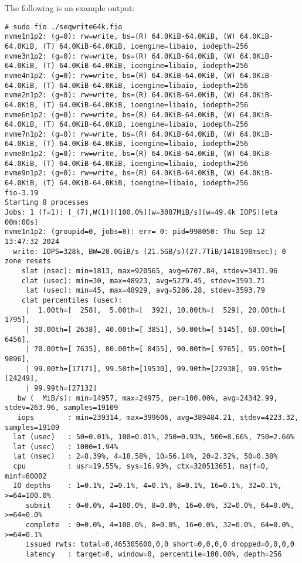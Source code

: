 The following is an example output:

\begin{verbatim}
# sudo fio ./seqwrite64k.fio
nvme1n1p2: (g=0): rw=write, bs=(R) 64.0KiB-64.0KiB, (W) 64.0KiB-64.0KiB, (T) 64.0KiB-64.0KiB, ioengine=libaio, iodepth=256
nvme3n1p2: (g=0): rw=write, bs=(R) 64.0KiB-64.0KiB, (W) 64.0KiB-64.0KiB, (T) 64.0KiB-64.0KiB, ioengine=libaio, iodepth=256
nvme4n1p2: (g=0): rw=write, bs=(R) 64.0KiB-64.0KiB, (W) 64.0KiB-64.0KiB, (T) 64.0KiB-64.0KiB, ioengine=libaio, iodepth=256
nvme2n1p2: (g=0): rw=write, bs=(R) 64.0KiB-64.0KiB, (W) 64.0KiB-64.0KiB, (T) 64.0KiB-64.0KiB, ioengine=libaio, iodepth=256
nvme6n1p2: (g=0): rw=write, bs=(R) 64.0KiB-64.0KiB, (W) 64.0KiB-64.0KiB, (T) 64.0KiB-64.0KiB, ioengine=libaio, iodepth=256
nvme7n1p2: (g=0): rw=write, bs=(R) 64.0KiB-64.0KiB, (W) 64.0KiB-64.0KiB, (T) 64.0KiB-64.0KiB, ioengine=libaio, iodepth=256
nvme8n1p2: (g=0): rw=write, bs=(R) 64.0KiB-64.0KiB, (W) 64.0KiB-64.0KiB, (T) 64.0KiB-64.0KiB, ioengine=libaio, iodepth=256
nvme9n1p2: (g=0): rw=write, bs=(R) 64.0KiB-64.0KiB, (W) 64.0KiB-64.0KiB, (T) 64.0KiB-64.0KiB, ioengine=libaio, iodepth=256
fio-3.19
Starting 8 processes
Jobs: 1 (f=1): [_(7),W(1)][100.0%][w=3087MiB/s][w=49.4k IOPS][eta 00m:00s]
nvme1n1p2: (groupid=0, jobs=8): err= 0: pid=998050: Thu Sep 12 13:47:32 2024
  write: IOPS=328k, BW=20.0GiB/s (21.5GB/s)(27.7TiB/1418198msec); 0 zone resets
    slat (nsec): min=1813, max=920565, avg=6707.84, stdev=3431.96
    clat (usec): min=30, max=48923, avg=5279.45, stdev=3593.71
     lat (usec): min=45, max=48929, avg=5286.28, stdev=3593.79
    clat percentiles (usec):
     |  1.00th=[  258],  5.00th=[  392], 10.00th=[  529], 20.00th=[ 1795],
     | 30.00th=[ 2638], 40.00th=[ 3851], 50.00th=[ 5145], 60.00th=[ 6456],
     | 70.00th=[ 7635], 80.00th=[ 8455], 90.00th=[ 9765], 95.00th=[ 9896],
     | 99.00th=[17171], 99.50th=[19530], 99.90th=[22938], 99.95th=[24249],
     | 99.99th=[27132]
   bw (  MiB/s): min=14957, max=24975, per=100.00%, avg=24342.99, stdev=263.96, samples=19109
   iops        : min=239314, max=399606, avg=389484.21, stdev=4223.32, samples=19109
  lat (usec)   : 50=0.01%, 100=0.01%, 250=0.93%, 500=8.66%, 750=2.66%
  lat (usec)   : 1000=1.94%
  lat (msec)   : 2=8.39%, 4=18.58%, 10=56.14%, 20=2.32%, 50=0.38%
  cpu          : usr=19.55%, sys=16.93%, ctx=320513651, majf=0, minf=60002
  IO depths    : 1=0.1%, 2=0.1%, 4=0.1%, 8=0.1%, 16=0.1%, 32=0.1%, >=64=100.0%
     submit    : 0=0.0%, 4=100.0%, 8=0.0%, 16=0.0%, 32=0.0%, 64=0.0%, >=64=0.0%
     complete  : 0=0.0%, 4=100.0%, 8=0.0%, 16=0.0%, 32=0.0%, 64=0.0%, >=64=0.1%
     issued rwts: total=0,465305600,0,0 short=0,0,0,0 dropped=0,0,0,0
     latency   : target=0, window=0, percentile=100.00%, depth=256


\end{verbatim}
